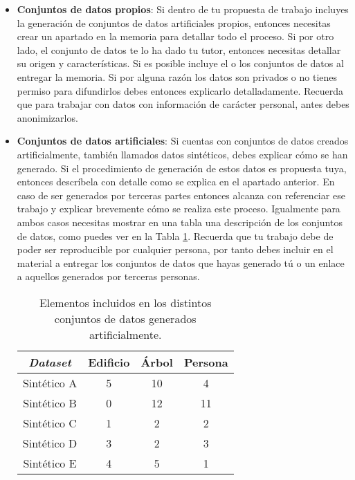 \begin{itemize}
    \item {\bf Conjuntos de datos propios}: Si dentro de tu propuesta de trabajo incluyes la generación de conjuntos de datos artificiales propios, entonces necesitas crear un apartado en la memoria para detallar todo el proceso. Si por otro lado, el conjunto de datos te lo ha dado tu tutor, entonces necesitas detallar su origen y características. Si es posible incluye el o los conjuntos de datos al entregar la memoria. Si por alguna razón los datos son privados o no tienes permiso para difundirlos debes entonces explicarlo detalladamente. Recuerda que para trabajar con datos con información de carácter personal, antes debes anonimizarlos. 
    \item {\bf Conjuntos de datos artificiales}: Si cuentas con conjuntos de datos creados artificialmente, también llamados datos sintéticos, debes explicar cómo se han generado. Si el procedimiento de generación de estos datos es propuesta tuya, entonces descríbela con detalle como se explica en el apartado anterior. En caso de ser generados por terceras partes entonces alcanza con referenciar ese trabajo y explicar brevemente cómo se realiza este proceso. Igualmente para ambos casos necesitas mostrar en una tabla una descripción de los conjuntos de datos, como puedes ver en la Tabla \ref{tab:fake}. Recuerda que tu trabajo debe de poder ser reproducible por cualquier persona, por tanto debes incluir en el material a entregar los conjuntos de datos que hayas generado tú o un enlace a aquellos generados por terceras personas.

\begin{table}[!ht]
\centering
\label{tab:results}
\begin{tabular}{c|ccc}
\hline
{\it \textbf{Dataset}} & \textbf{Edificio} & \textbf{Árbol} & \textbf{Persona} \\
\hline
Sintético A & 5 & 10 & 4 \\
Sintético B & 0 & 12 & 11 \\
Sintético C & 1 & 2 & 2 \\
Sintético D & 3 & 2 & 3 \\
Sintético E & 4 & 5 & 1 \\
\hline
\end{tabular}
\caption{Elementos incluidos en los distintos conjuntos de datos generados artificialmente.\label{tab:fake}}
\end{table}
\end{itemize}

